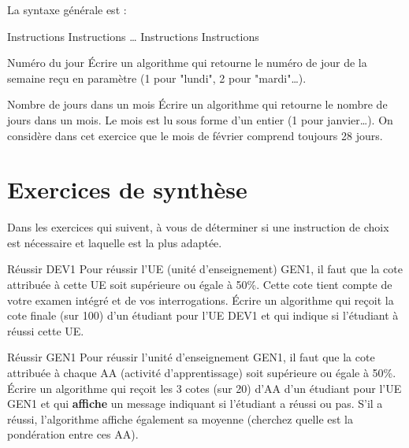 	La syntaxe générale est :
	
	\begin{LDA}
				\Stmt Instructions
				\Stmt Instructions
			\Empty \dots
				\Stmt Instructions
				\Stmt Instructions
		\EndSwitch
	\end{LDA}
	
	\begin{Exercice}{Numéro du jour}
		Écrire un algorithme qui retourne le numéro de jour de la semaine
		reçu en paramètre (1 pour "lundi", 2 pour "mardi"\dots).
	\end{Exercice}
	
	\begin{Exercice}{Nombre de jours dans un mois}
		Écrire un algorithme qui retourne le nombre de jours dans un mois. 
		Le mois est lu sous forme d’un entier (1 pour janvier\dots).
		On considère dans cet exercice que le mois de février
		comprend toujours 28 jours.
	\end{Exercice}
		
\section{Exercices de synthèse}

	Dans les exercices qui suivent,
	à vous de déterminer si une instruction de choix est nécessaire
	et laquelle est la plus adaptée.

	\begin{Exercice}{Réussir DEV1}
		Pour réussir l'UE (unité d'enseignement) GEN1,
		il faut que la cote attribuée à cette UE 
		soit supérieure ou égale à 50\%.
		Cette cote tient compte de votre examen intégré
		et de vos interrogations.
		Écrire un algorithme 
		qui reçoit la cote finale (sur 100)
		d'un étudiant pour l'UE DEV1
		et qui indique si l'étudiant à réussi cette UE.
	\end{Exercice}		

	\begin{Exercice}{Réussir GEN1}
		\label{algo:réussirGEN1}
		Pour réussir l'unité d'enseignement GEN1,
		il faut que la cote attribuée à chaque AA (activité d'apprentissage)
		soit supérieure ou égale à 50\%.
		Écrire un algorithme qui reçoit les 3 cotes (sur 20) d'AA d'un étudiant
		pour l'UE GEN1 et qui \textbf{affiche} un message
		indiquant si l'étudiant a réussi ou pas.
		S'il a réussi, l'algorithme affiche également sa moyenne
		(cherchez quelle est la pondération entre ces AA).
	\end{Exercice}		
	
